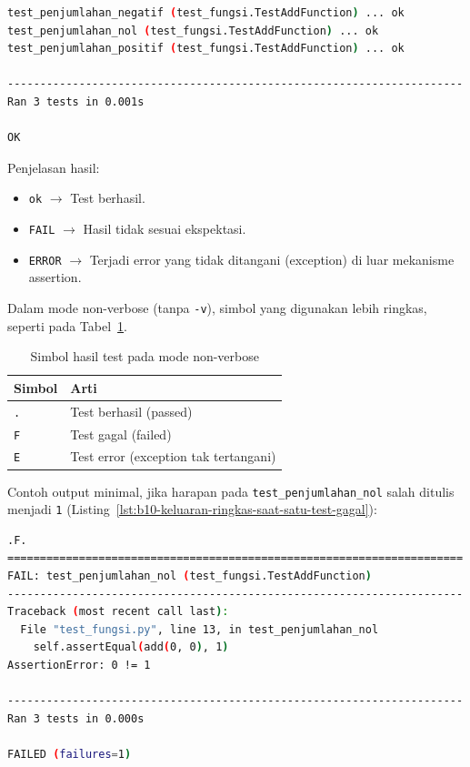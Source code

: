 \begin{lstlisting}[language=bash, caption={Keluaran dengan opsi verbose}, label={lst:b10-keluaran-dengan-opsi-verbose}]
test_penjumlahan_negatif (test_fungsi.TestAddFunction) ... ok
test_penjumlahan_nol (test_fungsi.TestAddFunction) ... ok
test_penjumlahan_positif (test_fungsi.TestAddFunction) ... ok

----------------------------------------------------------------------
Ran 3 tests in 0.001s

OK
\end{lstlisting}

Penjelasan hasil:
\begin{itemize}
    \item \texttt{ok} $\rightarrow$ Test berhasil.
    \item \texttt{FAIL} $\rightarrow$ Hasil tidak sesuai ekspektasi.
    \item \texttt{ERROR} $\rightarrow$ Terjadi error yang tidak ditangani (exception) di luar mekanisme assertion.
\end{itemize}

Dalam mode non-verbose (tanpa \texttt{-v}), simbol yang digunakan lebih ringkas, seperti pada Tabel~\ref{tab:b10-simbol}.

\begin{table}[H]
  \centering
  \caption{Simbol hasil test pada mode non-verbose}
  \label{tab:b10-simbol}
  \begin{tabularx}{\textwidth}{lX}
    \hline
    \textbf{Simbol} & \textbf{Arti} \\
    \hline
    \texttt{.} & Test berhasil (passed) \\
    \hline
    \texttt{F} & Test gagal (failed) \\
    \hline
    \texttt{E} & Test error (exception tak tertangani) \\
    \hline
  \end{tabularx}
\end{table}

\noindent
Contoh output minimal, jika harapan pada \texttt{test\_penjumlahan\_nol} salah ditulis menjadi \texttt{1} (Listing~\ref{lst:b10-keluaran-ringkas-saat-satu-test-gagal}):
\begin{lstlisting}[language=bash, caption={Keluaran ringkas saat satu test gagal}, label={lst:b10-keluaran-ringkas-saat-satu-test-gagal}]
.F.
======================================================================
FAIL: test_penjumlahan_nol (test_fungsi.TestAddFunction)
----------------------------------------------------------------------
Traceback (most recent call last):
  File "test_fungsi.py", line 13, in test_penjumlahan_nol
    self.assertEqual(add(0, 0), 1)
AssertionError: 0 != 1

----------------------------------------------------------------------
Ran 3 tests in 0.000s

FAILED (failures=1)
\end{lstlisting}

